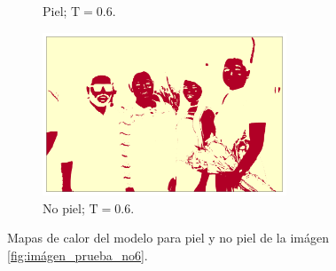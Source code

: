 \begin{figure}[ht!]
\begin{subfigure}{0.4\textwidth}
        \caption{Piel; $\text{T} = 0.6$.}
    \end{subfigure}
    \hspace{1cm}
    \begin{subfigure}{0.4\textwidth}
        \centering
        \includegraphics[width=0.8\textwidth]{../figures/image6/image_06_treshbg_60percent.png}
        \caption{No piel; $\text{T} = 0.6$.}
    \end{subfigure}
    \caption{Mapas de calor del modelo para piel y no piel de la imágen \cref{fig:imágen_prueba_no6}.}
    \label{fig:model_applied_no6}
\end{figure}

